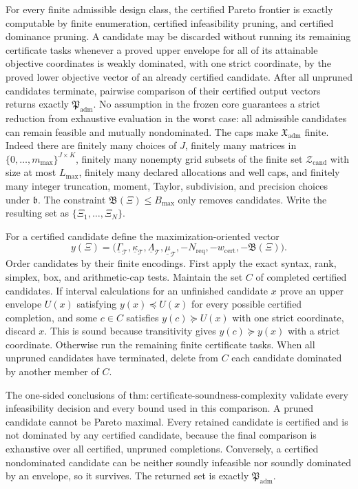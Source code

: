 For every finite admissible design class, the certified Pareto frontier is exactly computable by finite enumeration, certified infeasibility pruning, and certified dominance pruning.  A candidate may be discarded without running its remaining certificate tasks whenever a proved upper envelope for all of its attainable objective coordinates is weakly dominated, with one strict coordinate, by the proved lower objective vector of an already certified candidate.  After all unpruned candidates terminate, pairwise comparison of their certified output vectors returns exactly \(\mathfrak P_{\mathrm{adm}}\).  No assumption in the frozen core guarantees a strict reduction from exhaustive evaluation in the worst case: all admissible candidates can remain feasible and mutually nondominated.
The caps make \(\mathfrak X_{\mathrm{adm}}\) finite.  Indeed there are finitely many choices of \(J\), finitely many matrices in \(\{0,\ldots,m_{\max}\}^{J\times K}\), finitely many nonempty grid subsets of the finite set \(\mathcal Z_{\mathrm{cand}}\) with size at most \(L_{\max}\), finitely many declared allocations and well caps, and finitely many integer truncation, moment, Taylor, subdivision, and precision choices under \(\mathfrak b\).  The constraint \(\mathfrak B(\Xi)\leq B_{\max}\) only removes candidates.  Write the resulting set as \(\{\Xi_1,\ldots,\Xi_N\}\).

For a certified candidate define the maximization-oriented vector
\[
 y(\Xi)=\bigl(\underline\Gamma_{\mathcal T},
 \underline\kappa_{\mathcal T},
 \underline\Lambda_{\mathcal T},
 \underline\mu_{\mathcal T},
 -N_{\mathrm{req}},-w_{\mathrm{cert}},-\mathfrak B(\Xi)\bigr). \tag{33}
\]
Order candidates by their finite encodings.  First apply the exact syntax, rank, simplex, box, and arithmetic-cap tests.  Maintain the set \(C\) of completed certified candidates.  If interval calculations for an unfinished candidate \(x\) prove an upper envelope \(U(x)\) satisfying \(y(x)\preceq U(x)\) for every possible certified completion, and some \(c\in C\) satisfies \(y(c)\succeq U(x)\) with one strict coordinate, discard \(x\).  This is sound because transitivity gives \(y(c)\succeq y(x)\) with a strict coordinate.  Otherwise run the remaining finite certificate tasks.  When all unpruned candidates have terminated, delete from \(C\) each candidate dominated by another member of \(C\).

The one-sided conclusions of \(\mathrm{thm{:}certificate\text{-}soundness\text{-}complexity}\) validate every infeasibility decision and every bound used in this comparison.  A pruned candidate cannot be Pareto maximal.  Every retained candidate is certified and is not dominated by any certified candidate, because the final comparison is exhaustive over all certified, unpruned completions.  Conversely, a certified nondominated candidate can be neither soundly infeasible nor soundly dominated by an envelope, so it survives.  The returned set is exactly \(\mathfrak P_{\mathrm{adm}}\).

